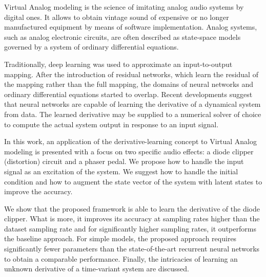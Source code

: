 Virtual Analog modeling is the science of imitating analog audio systems by digital ones. It allows to obtain vintage sound of expensive or no longer manufactured equipment by means of software implementation. Analog systems, such as analog electronic circuits, are often described as state-space models governed by a system of ordinary differential equations. 

Traditionally, deep learning was used to approximate an input-to-output mapping. After the introduction of residual networks, which learn the residual of the mapping rather than the full mapping, the domains of neural networks and ordinary differential equations started to overlap. Recent developments suggest that neural networks are capable of learning the derivative of a dynamical system from data. The learned derivative may be supplied to a numerical solver of choice to compute the actual system output in response to an input signal. 

In this work, an application of the derivative-learning concept to Virtual Analog modeling is presented with a focus on two specific audio effects: a diode clipper (distortion) circuit and a phaser pedal. We propose how to handle the input signal as an excitation of the system. We suggest how to handle the initial condition and how to augment the state vector of the system with latent states to improve the accuracy.

We show that the proposed framework is able to learn the derivative of the diode clipper. What is more, it improves its accuracy at sampling rates higher than the dataset sampling rate and for significantly higher sampling rates, it outperforms the baseline approach. For simple models, the proposed approach requires significantly fewer parameters than the state-of-the-art recurrent neural networks to obtain a comparable performance. Finally, the intricacies of learning an unknown derivative of a time-variant system are discussed.
